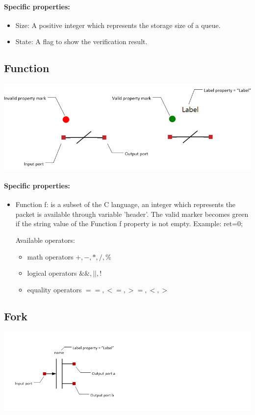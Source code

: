 \documentclass[a4paper,11pt,final]{article}
\begin{document}
\paragraph{Specific properties:}
\begin{itemize}
\item Size: A positive integer which represents the storage size of a queue.
\item State: A flag to show the verification result.
\end{itemize}

\subsection{Function}
\includegraphics[width=1.0\textwidth]{function}
\paragraph{Specific properties:}

\begin{itemize}
\item Function f: is a subset of the C language, an integer which represents the packet is available through variable 'header'. The valid marker becomes green if the  string value of the Function f property is not empty. Example: ret=0;

Available operators:
\begin{itemize}
\item math operators $+,-,*,/,\%$
\item logical operators $\&\&,||,!$
\item equality operators $==,<=,>=,<,>$
\end{itemize}
\end{itemize}


\subsection{Fork}
\includegraphics[width=1.0\textwidth]{fork}
\end{document}
